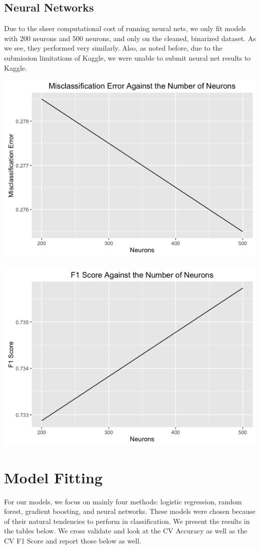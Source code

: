 \documentclass{article}
\begin{document}
\subsection{Neural Networks}
Due to the sheer computational cost of running neural nets, we only fit models with 200 neurons and 500 neurons, and only on the cleaned, binarized dataset. As we see, they performed very similarly. Also, as noted before, due to the submission limitations of Kaggle, we were unable to submit neural net results to Kaggle. \\

\centerline{\includegraphics[scale=.35]{diagrams/8nn.png} ~~~~~~~~~~ \includegraphics[scale=.35]{diagrams/9nn.png}}

\section{Model Fitting}
For our models, we focus on mainly four methods: logistic regression, random forest, gradient boosting, and neural networks. These models were chosen because of their natural tendencies to perform in classification. We present the results in the tables below. We cross validate and look at the CV Accuracy as well as the CV F1 Score and report those below as well.
\end{document}

